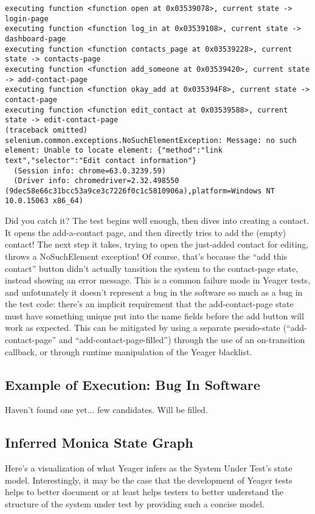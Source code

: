 {
\begin{verbatim}
executing function <function open at 0x03539078>, current state -> login-page
executing function <function log_in at 0x03539108>, current state -> dashboard-page
executing function <function contacts_page at 0x03539228>, current state -> contacts-page
executing function <function add_someone at 0x03539420>, current state -> add-contact-page
executing function <function okay_add at 0x035394F8>, current state -> contact-page
executing function <function edit_contact at 0x03539588>, current state -> edit-contact-page
(traceback omitted)
selenium.common.exceptions.NoSuchElementException: Message: no such element: Unable to locate element: {"method":"link text","selector":"Edit contact information"}
  (Session info: chrome=63.0.3239.59)
  (Driver info: chromedriver=2.32.498550 (9dec58e66c31bcc53a9ce3c7226f0c1c5810906a),platform=Windows NT 10.0.15063 x86_64)
\end{verbatim}
}
Did you catch it? The test begins well enough, then dives into creating a contact. It opens the add-a-contact page, and then directly tries to add the (empty) contact! The next step it takes, trying to open the just-added contact for editing, throws a NoSuchElement exception! Of course, that's because the  ``add this contact'' button didn't actually tansition the system to the contact-page state, instead showing an error message. This is a common failure mode in Yeager tests, and unfotunately it doesn't represent a bug in the software so much as a bug in the test code: there's an implicit requirement that the add-contact-page state must have something unique put into the name fields before the add button will work as expected. This can be mitigated by using a separate pseudo-state (``add-contact-page'' and ``add-contact-page-filled'') through the use of an on-transition callback, or through runtime manipulation of the Yeager blacklist.

\subsection{Example of Execution: Bug In Software}
Haven't found one yet... few candidates. Will be filled.

\subsection{Inferred Monica State Graph}

Here's a visualization of what Yeager infers as the System Under Test's state model. Interestingly, it may be the case that the development of Yeager tests helps to better document or at least helps testers to better understand the structure of the system under test by providing such a concise model.


